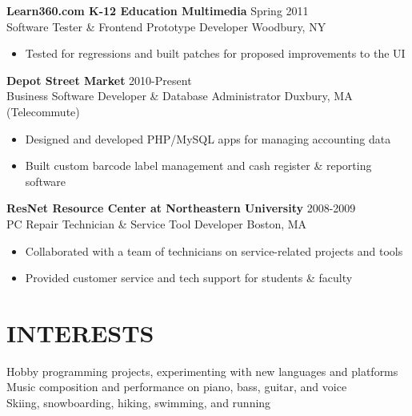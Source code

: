 \documentclass[line,margin]{res}
\begin{document}
\begin{resume}
    {\large \textbf{Learn360.com K-12 Education Multimedia}}
    \hfill Spring 2011 \\
    Software Tester \& Frontend Prototype Developer
    \hfill Woodbury, NY
    \begin{itemize}  \itemsep -2pt %
        \item Tested for regressions and built patches for proposed improvements to the UI
    \end{itemize}

    {\large \textbf{Depot Street Market}}
    \hfill 2010-Present \\
    Business Software Developer \& Database Administrator
    \hfill Duxbury, MA {\footnotesize (Telecommute)}
    \begin{itemize}  \itemsep -2pt %
        \item Designed and developed PHP/MySQL apps for managing accounting data
        \item Built custom barcode label management and cash register \& reporting software
    \end{itemize}

    {\large \textbf{ResNet Resource Center at Northeastern University}}
    \hfill 2008-2009 \\
    PC Repair Technician \& Service Tool Developer
    \hfill Boston, MA
    \begin{itemize}  \itemsep -2pt %
        \item Collaborated with a team of technicians on service-related projects and tools
        \item Provided customer service and tech support for students \& faculty
    \end{itemize}

\section{INTERESTS}
    Hobby programming projects, experimenting with new languages and platforms \\
    Music composition and performance on piano, bass, guitar, and voice \\
    Skiing, snowboarding, hiking, swimming, and running

\end{resume}
\end{document}
